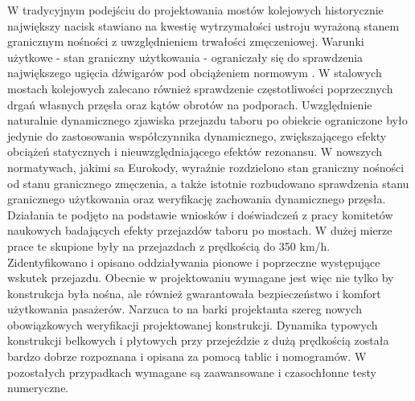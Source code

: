W tradycyjnym podejściu do projektowania mostów kolejowych historycznie największy nacisk stawiano na kwestię wytrzymałości ustroju wyrażoną stanem granicznym nośności z uwzględnieniem trwałości zmęczeniowej. Warunki użytkowe - stan graniczny użytkowania - ograniczały się do sprawdzenia największego ugięcia dźwigarów pod obciążeniem normowym \parencite{PKNf}. W stalowych mostach kolejowych zalecano również sprawdzenie częstotliwości poprzecznych drgań własnych przęsła oraz kątów obrotów na podporach. Uwzględnienie naturalnie dynamicznego zjawiska przejazdu taboru po obiekcie ograniczone było jedynie do zastosowania współczynnika dynamicznego, zwiększającego efekty obciążeń statycznych i nieuwzględniającego efektów rezonansu. 
W nowszych normatywach, jakimi sa Eurokody, wyraźnie rozdzielono stan graniczny nośności od stanu granicznego zmęczenia, a także istotnie rozbudowano sprawdzenia stanu granicznego użytkowania oraz weryfikację zachowania dynamicznego przęsła. Działania te podjęto na podstawie wniosków i doświadczeń z pracy komitetów naukowych badających efekty przejazdów taboru po mostach. W dużej mierze prace te skupione były na przejazdach z prędkością do 350 km/h. Zidentyfikowano i opisano oddziaływania pionowe i poprzeczne występujące wskutek przejazdu. Obecnie w projektowaniu wymagane jest więc nie tylko by konstrukcja była nośna, ale również gwarantowała bezpieczeństwo i komfort użytkowania pasażerów. Narzuca to na barki projektanta szereg nowych obowiązkowych weryfikacji projektowanej konstrukcji. Dynamika typowych konstrukcji belkowych i płytowych przy przejeździe z dużą prędkością została bardzo dobrze rozpoznana i opisana za pomocą tablic i nomogramów. W pozostałych przypadkach wymagane są zaawansowane i czasochłonne testy numeryczne. 

